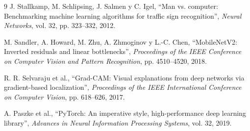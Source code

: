 \documentclass[11pt,letterpaper]{article}
\begin{document}
\begin{thebibliography}{9}
J. Stallkamp, M. Schlipsing, J. Salmen y C. Igel,
``Man vs. computer: Benchmarking machine learning algorithms for traffic sign recognition'',
\emph{Neural Networks}, vol. 32, pp. 323--332, 2012.

M. Sandler, A. Howard, M. Zhu, A. Zhmoginov y L.-C. Chen,
``MobileNetV2: Inverted residuals and linear bottlenecks'',
\emph{Proceedings of the IEEE Conference on Computer Vision and Pattern Recognition}, pp. 4510--4520, 2018.

R. R. Selvaraju et al.,
``Grad-CAM: Visual explanations from deep networks via gradient-based localization'',
\emph{Proceedings of the IEEE International Conference on Computer Vision}, pp. 618--626, 2017.

A. Paszke et al.,
``PyTorch: An imperative style, high-performance deep learning library'',
\emph{Advances in Neural Information Processing Systems}, vol. 32, 2019.
\end{thebibliography}
\end{document}

